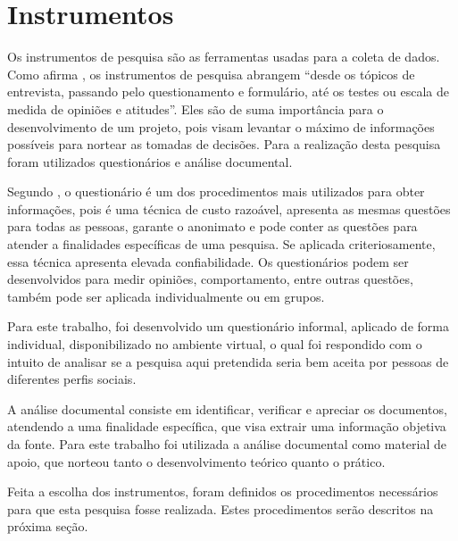 \section{Instrumentos}

\par Os instrumentos de pesquisa são as ferramentas usadas para a coleta de dados. Como afirma , os instrumentos de pesquisa abrangem “desde os tópicos de entrevista, passando pelo questionamento e formulário, até os testes ou escala de medida de opiniões e atitudes”. Eles são de suma importância para o desenvolvimento de um projeto, pois visam levantar o máximo de informações possíveis para nortear as tomadas de decisões. Para a realização desta pesquisa foram utilizados questionários e análise documental.

\par Segundo , o questionário é um dos procedimentos mais utilizados para obter informações, pois é uma técnica de custo razoável, apresenta as mesmas questões para todas as pessoas, garante o anonimato e pode conter as questões para atender a finalidades específicas de uma pesquisa. Se aplicada criteriosamente, essa técnica apresenta elevada confiabilidade. Os questionários podem ser desenvolvidos para medir opiniões, comportamento, entre outras questões, também pode ser aplicada individualmente ou em grupos.

\par Para este trabalho, foi desenvolvido um questionário informal, aplicado de forma individual, disponibilizado no ambiente virtual, o qual foi respondido com o intuito de analisar se a pesquisa aqui pretendida seria bem aceita por pessoas de diferentes perfis sociais. %


\par A análise documental consiste em identificar, verificar e apreciar os documentos, atendendo a uma finalidade específica, que visa extrair uma informação objetiva da fonte. Para este trabalho foi utilizada a análise documental como material de apoio, que norteou tanto o desenvolvimento teórico quanto o prático.

\par Feita a escolha dos instrumentos, foram definidos os procedimentos necessários para que esta pesquisa fosse realizada. Estes procedimentos serão descritos na próxima seção.


